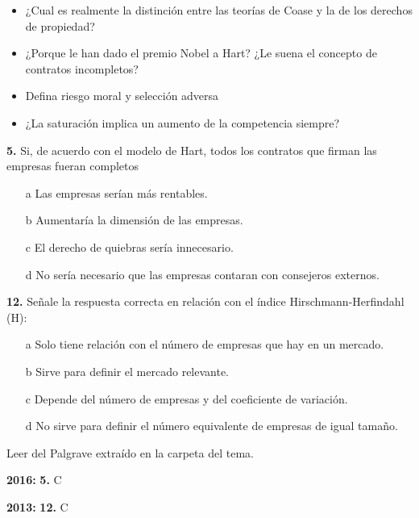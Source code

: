 \documentclass{nuevotema}
\begin{document}
\conceptos


\preguntas


\begin{itemize}
	\item ¿Cual es realmente la distinción entre las teorías de Coase y la de los derechos de propiedad? 
	\item ¿Porque le han dado el premio Nobel a Hart? ¿Le suena el concepto de contratos incompletos?
	\item Defina riesgo moral y selección adversa
	\item ¿La saturación implica un aumento de la competencia siempre?
\end{itemize}

\textbf{5.} Si, de acuerdo con el modelo de Hart, todos los contratos que firman las empresas fueran completos

\begin{itemize}
	\item[a] Las empresas serían más rentables.
	\item[b] Aumentaría la dimensión de las empresas.
	\item[c] El derecho de quiebras sería innecesario.
	\item[d] No sería necesario que las empresas contaran con consejeros externos.
\end{itemize}

\textbf{12.} Señale la respuesta correcta en relación con el índice Hirschmann-Herfindahl (H):
\begin{itemize}
	\item[a] Solo tiene relación con el número de empresas que hay en un mercado.
	\item[b] Sirve para definir el mercado relevante.
	\item[c] Depende del número de empresas y del coeficiente de variación.
	\item[d] No sirve para definir el número equivalente de empresas de igual tamaño.
\end{itemize}


\notas

Leer  del Palgrave extraído en la carpeta del tema.

\textbf{2016:} \textbf{5.} C

\textbf{2013:} \textbf{12.} C
\end{document}
